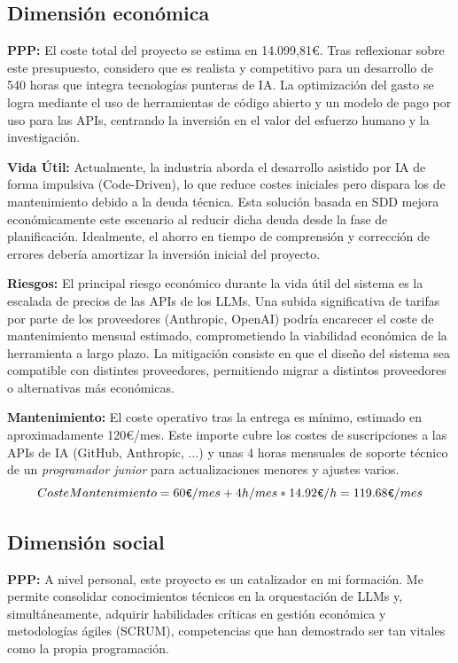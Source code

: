 \documentclass[11pt, letterpaper]{article}
\begin{document}
\subsection{Dimensión económica}
\textbf{PPP:} El coste total del proyecto se estima en 14.099,81€. Tras reflexionar sobre este presupuesto, considero que es realista y competitivo para un desarrollo de 540 horas que integra tecnologías punteras de IA. La optimización del gasto se logra mediante el uso de herramientas de código abierto y un modelo de pago por uso para las APIs, centrando la inversión en el valor del esfuerzo humano y la investigación.

\textbf{Vida Útil:} Actualmente, la industria aborda el desarrollo asistido por IA de forma impulsiva (Code-Driven), lo que reduce costes iniciales pero dispara los de mantenimiento debido a la deuda técnica. Esta solución basada en SDD mejora económicamente este escenario al reducir dicha deuda desde la fase de planificación. Idealmente, el ahorro en tiempo de comprensión y corrección de errores debería amortizar la inversión inicial del proyecto.

\textbf{Riesgos:} El principal riesgo económico durante la vida útil del sistema es la escalada de precios de las APIs de los LLMs. Una subida significativa de tarifas por parte de los proveedores (Anthropic, OpenAI) podría encarecer el coste de mantenimiento mensual estimado, comprometiendo la viabilidad económica de la herramienta a largo plazo. La mitigación consiste en que el diseño del sistema sea compatible con distintes proveedores, permitiendo migrar a distintos proveedores o alternativas más económicas.

\textbf{Mantenimiento:} El coste operativo tras la entrega es mínimo, estimado en aproximadamente 120€/mes. Este importe cubre los costes de suscripciones a las APIs de IA (GitHub, Anthropic, ...) y unas 4 horas mensuales de soporte técnico de un \textit{programador junior} para actualizaciones menores y ajustes varios.
\begin{equation}
    CosteMantenimiento = 60\verb|€|/mes + 4h/mes * 14{.}92\verb|€|/h = 119{.}68\verb|€|/mes
\end{equation}

\subsection{Dimensión social}
\textbf{PPP:} A nivel personal, este proyecto es un catalizador en mi formación. Me permite consolidar conocimientos técnicos en la orquestación de LLMs y, simultáneamente, adquirir habilidades críticas en gestión económica y metodologías ágiles (SCRUM), competencias que han demostrado ser tan vitales como la propia programación.
\end{document}
